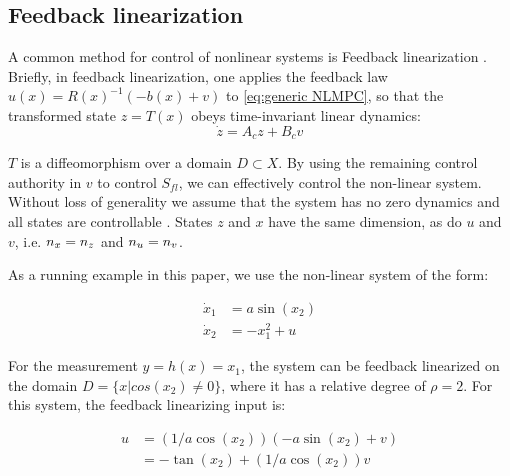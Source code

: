\subsection{Feedback linearization}
\label{sec:feedbacklin}
A common method for control of nonlinear systems is Feedback linearization \cite{khalil}. 
Briefly, in feedback linearization, one applies the feedback law $u(x) = R(x)^{-1}(-b(x)+v)$ to \eqref{eq:generic NLMPC}, so that the transformed state $z = T(x)$ obeys time-invariant linear dynamics:
\begin{equation}
\label{eq:LTI_fb_lin}
\dot{z} = A_cz + B_cv
\end{equation}

$T$ is a diffeomorphism over a domain $D \subset X$.
By using the remaining control authority in $v$ to control $S_{fl}$, we can effectively control the non-linear system.
Without loss of generality we assume that the system has no zero dynamics and all states are controllable \cite{khalil}. 
States $z$ and $x$ have the same dimension, as do $u$ and $v$, i.e. $n_x = n_z$ and $n_u = n_v$.

 As a running example in this paper, we use the non-linear system of the form:

\begin{subequations}
\label{eq:toy_dynamics}
\begin{align}
\dot{x}_1 &= a\sin(x_2) \\
\dot{x}_2 &=-x_1^2 + u 
\end{align}
\end{subequations}

For the measurement $y = h(x) = x_1$, the system can be feedback linearized on the domain $D = \lbrace x | cos(x_2) \neq 0 \rbrace $, where it has a relative degree of $\rho=2$. For this system, the feedback linearizing input is:

\begin{subequations}
\begin{align}
u &= (1/a\cos(x_2))(-a\sin(x_2)+v) \nonumber \\
&= -\tan(x_2) + (1/a\cos(x_2))v
\end{align}
\end{subequations}

